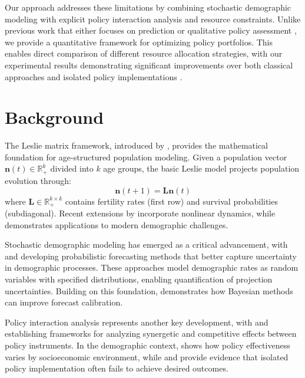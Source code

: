 \documentclass{article} %
\begin{document}
Our approach addresses these limitations by combining stochastic demographic modeling with explicit policy interaction analysis and resource constraints. Unlike previous work that either focuses on prediction \cite{Yu2023ProbabilisticCP} or qualitative policy assessment \cite{Wei2024TheSE}, we provide a quantitative framework for optimizing policy portfolios. This enables direct comparison of different resource allocation strategies, with our experimental results demonstrating significant improvements over both classical approaches \cite{Grant1996TheIO} and isolated policy implementations \cite{Cook2022TryingTR}.

\section{Background}
\label{sec:background}

The Leslie matrix framework, introduced by \cite{Grant1996TheIO}, provides the mathematical foundation for age-structured population modeling. Given a population vector $\mathbf{n}(t) \in \mathbb{R}^k_+$ divided into $k$ age groups, the basic Leslie model projects population evolution through:
\begin{equation}
    \mathbf{n}(t+1) = \mathbf{L}\mathbf{n}(t)
\end{equation}
where $\mathbf{L} \in \mathbb{R}^{k \times k}_+$ contains fertility rates (first row) and survival probabilities (subdiagonal). Recent extensions by \cite{López2022MonitoringIA} incorporate nonlinear dynamics, while \cite{Malafeyev2024ModelingAD} demonstrates applications to modern demographic challenges.

Stochastic demographic modeling has emerged as a critical advancement, with \cite{Booth2020CoherentMF} and \cite{Billari2014StochasticPF} developing probabilistic forecasting methods that better capture uncertainty in demographic processes. These approaches model demographic rates as random variables with specified distributions, enabling quantification of projection uncertainties. Building on this foundation, \cite{Yu2023ProbabilisticCP} demonstrates how Bayesian methods can improve forecast calibration.

Policy interaction analysis represents another key development, with \cite{Dijk2020ForksIT} and \cite{Wei2024TheSE} establishing frameworks for analyzing synergetic and competitive effects between policy instruments. In the demographic context, \cite{Zhang2023TheEO} shows how policy effectiveness varies by socioeconomic environment, while \cite{Cook2022TryingTR} and \cite{Zakharov2024ThreeDO} provide evidence that isolated policy implementation often fails to achieve desired outcomes.
\end{document}
